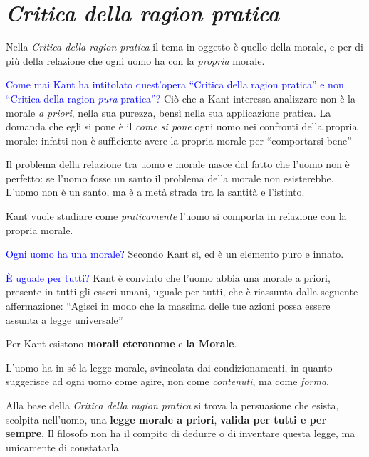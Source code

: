 \documentclass[a4paper, twoside, titlepage]{book}
\renewcommand{\emph}[1]{\textcolor{blue}{#1}}
\begin{document}
\chapter{\textit{Critica della ragion pratica}}

Nella \textit{Critica della ragion pratica} il tema in oggetto è quello della morale, e per di più della relazione che ogni uomo ha con la \textit{propria} morale.

\emph{Come mai Kant ha intitolato quest’opera “Critica della ragion pratica” e non “Critica della ragion \textit{pura} pratica”?}
Ciò che a Kant interessa analizzare non è la morale \textit{a priori}, nella sua purezza, bensì nella sua applicazione pratica.
La domanda che egli si pone è il \textit{come si pone} ogni uomo nei confronti della propria morale: infatti non è sufficiente avere la propria morale per “comportarsi bene”

Il problema della relazione tra uomo e morale nasce dal fatto che l’uomo non è perfetto: se l’uomo fosse un santo il problema della morale non esisterebbe.
L’uomo non è un santo, ma è a metà strada tra la santità e l’istinto.

Kant vuole studiare come \textit{praticamente} l’uomo si comporta in relazione con la propria morale.

\emph{Ogni uomo ha una morale?}
Secondo Kant sì, ed è un elemento puro e innato.

\emph{È uguale per tutti?}
Kant è convinto che l’uomo abbia una morale a priori, presente in tutti gli esseri umani, uguale per tutti, che è riassunta dalla seguente affermazione: “Agisci in modo che la massima delle tue azioni possa essere assunta a legge universale”

Per Kant esistono \textbf{morali eteronome} e \textbf{la Morale}.

L’uomo ha in sé la legge morale, svincolata dai condizionamenti, in quanto suggerisce ad ogni uomo come agire, non come \textit{contenuti}, ma come \textit{forma}. 

Alla base della \textit{Critica della ragion pratica} si trova la persuasione che esista, scolpita nell’uomo, una \textbf{legge morale a priori}, \textbf{valida per tutti e per sempre}.
Il filosofo non ha il compito di dedurre o di inventare questa legge, ma unicamente di constatarla.
\end{document}
